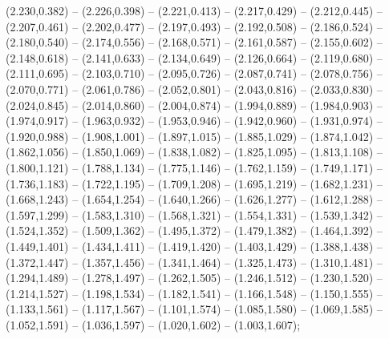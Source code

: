 (2.230,0.382) -- (2.226,0.398) -- (2.221,0.413) -- (2.217,0.429) -- (2.212,0.445) -- (2.207,0.461) -- (2.202,0.477) -- (2.197,0.493) -- (2.192,0.508) -- (2.186,0.524) -- (2.180,0.540) -- (2.174,0.556) -- (2.168,0.571) -- (2.161,0.587) -- (2.155,0.602) -- (2.148,0.618) -- (2.141,0.633) -- (2.134,0.649) -- (2.126,0.664) -- (2.119,0.680) -- (2.111,0.695) -- (2.103,0.710) -- (2.095,0.726) -- (2.087,0.741) -- (2.078,0.756) -- (2.070,0.771) -- (2.061,0.786) -- (2.052,0.801) -- (2.043,0.816) -- (2.033,0.830) -- (2.024,0.845) -- (2.014,0.860) -- (2.004,0.874) -- (1.994,0.889) -- (1.984,0.903) -- (1.974,0.917) -- (1.963,0.932) -- (1.953,0.946) -- (1.942,0.960) -- (1.931,0.974) -- (1.920,0.988) -- (1.908,1.001) -- (1.897,1.015) -- (1.885,1.029) -- (1.874,1.042) -- (1.862,1.056) -- (1.850,1.069) -- (1.838,1.082) -- (1.825,1.095) -- (1.813,1.108) -- (1.800,1.121) -- (1.788,1.134) -- (1.775,1.146) -- (1.762,1.159) -- (1.749,1.171) -- (1.736,1.183) -- (1.722,1.195) -- (1.709,1.208) -- (1.695,1.219) -- (1.682,1.231) -- (1.668,1.243) -- (1.654,1.254) -- (1.640,1.266) -- (1.626,1.277) -- (1.612,1.288) -- (1.597,1.299) -- (1.583,1.310) -- (1.568,1.321) -- (1.554,1.331) -- (1.539,1.342) -- (1.524,1.352) -- (1.509,1.362) -- (1.495,1.372) -- (1.479,1.382) -- (1.464,1.392) -- (1.449,1.401) -- (1.434,1.411) -- (1.419,1.420) -- (1.403,1.429) -- (1.388,1.438) -- (1.372,1.447) -- (1.357,1.456) -- (1.341,1.464) -- (1.325,1.473) -- (1.310,1.481) -- (1.294,1.489) -- (1.278,1.497) -- (1.262,1.505) -- (1.246,1.512) -- (1.230,1.520) -- (1.214,1.527) -- (1.198,1.534) -- (1.182,1.541) -- (1.166,1.548) -- (1.150,1.555) -- (1.133,1.561) -- (1.117,1.567) -- (1.101,1.574) -- (1.085,1.580) -- (1.069,1.585) -- (1.052,1.591) -- (1.036,1.597) -- (1.020,1.602) -- (1.003,1.607);
